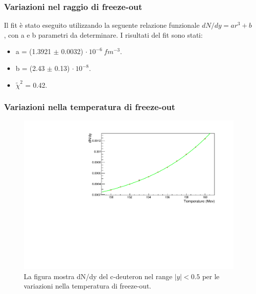 \documentclass[11pt]{beamer}
\begin{document}
	\begin{frame}
		\frametitle{Variazioni nel raggio di freeze-out}
		Il fit è stato eseguito utilizzando la seguente relazione funzionale $dN/dy =a r^3 +b$, con a e b parametri da determinare. I risultati del fit sono stati:
		\begin{itemize}
			\item a = (1.3921 $\pm$ 0.0032) $\cdot \ 10^{-6} \ fm^{-3}$.
			\item b = (2.43 $\pm$ 0.13) $\cdot 	\ 10^{-8}$.
			\item $\tilde{\chi}^2$ = 0.42.
		\end{itemize}	
		
	\end{frame}
	
	
	\begin{frame}
		\frametitle{Variazioni nella temperatura di freeze-out}
		
		\begin{figure}
			\centering
			\includegraphics[width=1 \linewidth]{pictures/var_temperaure.pdf}
			\caption{La figura mostra dN/dy del c-deuteron nel range $|y| < 0.5$ per le variazioni nella temperatura di freeze-out.}
		\end{figure}
	\end{frame}
	
\end{document}

